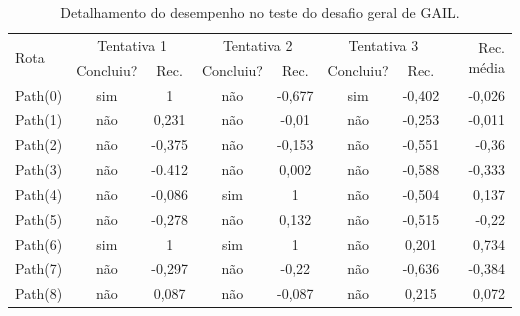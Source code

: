\begin{table}[htpb]
    \centering
    \caption{Detalhamento do desempenho no teste do desafio geral de GAIL.}
    \label{resultado-tabela-geral-gail}
    \begin{tabular}{|l|c|c|c|c|c|c|r|}
         \hline
         \multirow{2}{*}{Rota} & \multicolumn{2}{c|}{Tentativa 1}  & \multicolumn{2}{c|}{Tentativa 2} & \multicolumn{2}{c|}{Tentativa 3} & \multirow{2}{*}{Rec. média} \\ \cline{2-7}
                               & \small{Concluiu?}  & \small{Rec.} & \small{Concluiu?} &\small{Rec.} & \small{Concluiu?} &\small{Rec.} &                               \\ \hline
            Path(0)            &      sim          &   1          &    não            &      -0,677 &    sim            &      -0,402 &      -0,026                    \\ \hline
            Path(1)            &      não          &   0,231      &    não            &      -0,01  &    não            &      -0,253 &      -0,011                    \\ \hline
            Path(2)            &      não          &   -0,375     &    não            &      -0,153 &    não            &      -0,551 &      -0,36                     \\ \hline
            Path(3)            &      não          &   -0.412     &    não            &      0,002  &    não            &      -0,588 &      -0,333                    \\ \hline
            Path(4)            &      não          &   -0,086     &    sim            &      1      &    não            &      -0,504 &      0,137                     \\ \hline
            Path(5)            &      não          &   -0,278     &    não            &      0,132  &    não            &      -0,515 &      -0,22                     \\ \hline
            Path(6)            &      sim          &   1          &    sim            &      1      &    não            &      0,201  &      0,734                     \\ \hline
            Path(7)            &      não          &   -0,297     &    não            &      -0,22  &    não            &      -0,636 &      -0,384                    \\ \hline
            Path(8)            &      não          &   0,087      &    não            &      -0,087 &    não            &      0,215  &      0,072                     \\ \hline

\end{tabular}
\end{table}

